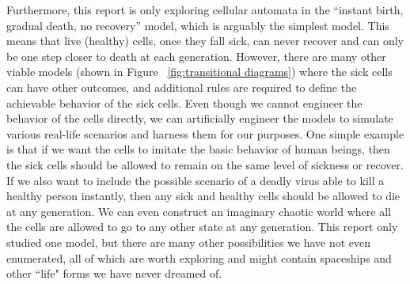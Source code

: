 \documentclass[12pt]{article}
\numberwithin{figure}{section} %
\begin{document}
Furthermore, this report is only exploring cellular automata in the “instant birth, gradual death, no recovery” model, which is arguably the simplest model. This means that live (healthy) cells, once they fall sick, can never recover and can only be one step closer to death at each generation. However, there are many other viable models (shown in Figure ~\ref{fig:transitional diagrams}) where the sick cells can have other outcomes, and additional rules are required to define the achievable behavior of the sick cells. Even though we cannot engineer the behavior of the cells directly, we can artificially engineer the models to simulate various real-life scenarios and harness them for our purposes. One simple example is that if we want the cells to imitate the basic behavior of human beings, then the sick cells should be allowed to remain on the same level of sickness or recover. If we also want to include the possible scenario of a deadly virus able to kill a healthy person instantly, then any sick and healthy cells should be allowed to die at any generation. We can even construct an imaginary chaotic world where all the cells are allowed to go to any other state at any generation. This report only studied one model, but there are many other possibilities we have not even enumerated, all of which are worth exploring and might contain spaceships and other “life" forms we have never dreamed of. 
\end{document}
